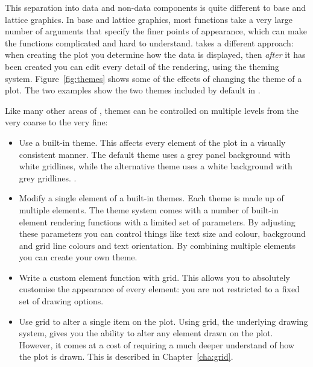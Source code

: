 This separation into data and non-data components is quite different to base and lattice graphics.  In base and lattice graphics, most functions take a very large number of arguments that specify the finer points of appearance, which can make the functions complicated and hard to understand.  \ggplot takes a different approach: when creating the plot you determine how the data is displayed, then {\em after} it has been created you can edit every detail of the rendering, using the theming system.  \noindent Figure~\ref{fig:themes} shows some of the effects of changing the theme of a plot.  The two examples show the two themes included by default in \ggplot.

% 


Like many other areas of \ggplot, themes can be controlled on multiple levels from the very coarse to the very fine:

\begin{itemize}
  \item Use a built-in theme.  This affects every element of the plot in a visually consistent manner.  The default theme uses a grey panel background with white gridlines, while the alternative theme uses a white background with grey gridlines.  .

  \item Modify a single element of a built-in themes. Each theme is made up of multiple elements. The theme system comes with a number of built-in element rendering functions with a limited set of parameters.  By adjusting these parameters you can control things like text size and colour, background and grid line colours and text orientation.  By combining multiple elements you can create your own theme.
  
  \item Write a custom element function with grid.  This allows you to absolutely customise the appearance of every element: you are not restricted to a fixed set of drawing options.  

  \item Use grid to alter a single item on the plot.  Using grid, the underlying drawing system, gives you the ability to alter any element drawn on the plot.  However, it comes at a cost of requiring a much deeper understand of how the plot is drawn.  This is described in Chapter~\ref{cha:grid}.
  
\end{itemize}

